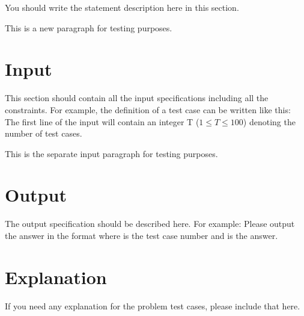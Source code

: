You should write the statement description here in this section.

This is a new paragraph for testing purposes.

\section*{Input}

This section should contain all the input specifications including all the
constraints. For example, the definition of a test case can be written like
this: The first line of the input will contain an integer T ($1 \le T \le 100$)
denoting the number of test cases.

This is the separate input paragraph for testing purposes.

\section*{Output}

The output specification should be described here. For example: Please
output the answer in the format  where  is the test case
number and  is the answer.

\section*{Explanation}
If you need any explanation for the problem test cases, please include
that here.